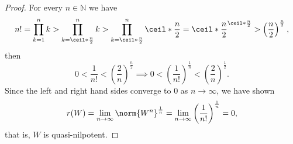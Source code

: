 \begin{proof}
    For every \(n \in \mathbb{N}\) we have
    \begin{equation*}
        n! = \prod_{k = 1}^n k > \prod_{k = \ceil*{\frac{n}{2}}}^n k > \prod_{k = \ceil*{\frac{n}{2}}}^{n} \ceil*{\frac{n}{2}} = \ceil*{\frac{n}{2}}^{\ceil*{\frac{n}{2}}} > \left(\frac{n}{2}\right)^{\frac{n}{2}},
    \end{equation*}
    then
    \begin{equation*}
        0 < \frac{1}{n!} <  \left(\frac{2}{n}\right)^{\frac{n}{2}} \implies 0 < \left(\frac{1}{n!}\right)^{\frac1n} < \left(\frac{2}{n}\right)^{\frac12}.
    \end{equation*}
    Since the left and right hand sides converge to \(0\) as \(n \to \infty\), we have shown
    \begin{equation*}
        r(W) = \lim_{n\to\infty}{\norm{W^n}^{\frac1n}} = \lim_{n\to \infty}{\left(\frac{1}{n!}\right)^{\frac1n}} = 0,
    \end{equation*}
    that is, \(W\) is quasi-nilpotent.
\end{proof}

